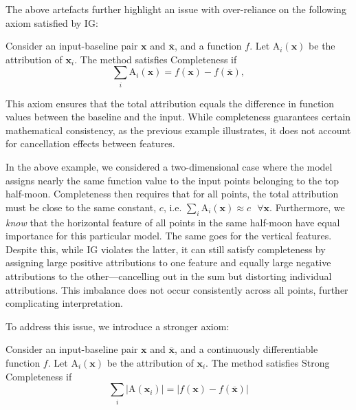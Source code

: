 The above artefacts further highlight an issue with over-reliance on the following axiom satisfied by IG: 
\begin{axiom}
	\label{ax:complete}
		Consider an input-baseline pair $\textbf{x}$ and $\overline{\textbf{x}}$, and a function $f$. Let $\text{A}_i(\textbf{x})$ be the attribution of $\textbf{x}_i$. The method satisfies Completeness if 
	\begin{equation}
		\sum_i{\text{A}_i(\textbf{x})} = f(\textbf{x}) - f(\overline{\textbf{x}}),
		\label{eq:completeness}
	\end{equation} 
\end{axiom}

This axiom ensures that the total attribution equals the difference in function values between the baseline and the input. While completeness guarantees certain mathematical consistency, as the previous example illustrates, it does not account for cancellation effects between features.

In the above example, we considered a two-dimensional case where the model assigns nearly the same function value to the input points belonging to the top half-moon. Completeness then requires that for all points, the total attribution must be close to the same constant, $c$, i.e. $\sum_i{\text{A}_i(\textbf{x})} \approx c\text{ } \forall \textbf{x}$. Furthermore, we \emph{know} that the horizontal feature of all points in the same half-moon have equal importance for this particular model. The same goes for the vertical features. Despite this, while IG violates the latter, it can still satisfy completeness by assigning large positive attributions to one feature and equally large negative attributions to the other—cancelling out in the sum but distorting individual attributions. This imbalance does not occur consistently across all points, further complicating interpretation.

To address this issue, we introduce a stronger axiom:

\begin{axiom}
	\label{ax:strong}
	Consider an input-baseline pair $\textbf{x}$ and $\overline{\textbf{x}}$, and a continuously differentiable function $f$. Let $\text{A}_i(\textbf{x})$ be the attribution of $\textbf{x}_i$. The method satisfies Strong Completeness if
	\begin{equation}
		\sum_i{|\text{A}(\textbf{x}_i)|} = |f(\textbf{x}) - f(\overline{\textbf{x}})|
	\end{equation}
\end{axiom} 


